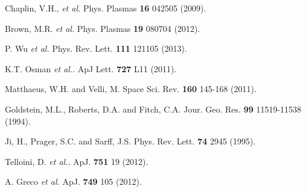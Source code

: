 \documentclass[aps,prl,amsmath,amssymb,reprint,superscriptaddress]{revtex4-1} %
\begin{document}
\begin{thebibliography}{99}
Chaplin, V.H., {\it et al.} Phys. Plasmas {\bf 16} 042505 (2009).

Brown, M.R. {\it et al.} Phys. Plasmas {\bf 19} 080704 (2012).

P. Wu {\it et al.} Phys. Rev. Lett. {\bf 111} 121105 (2013).

K.T. Osman {\it et al.}. ApJ Lett. {\bf 727} L11 (2011).

Matthaeus, W.H. and Velli, M. Space Sci. Rev. {\bf 160} 145-168 (2011).

Goldstein, M.L., Roberts, D.A. and Fitch, C.A. Jour. Geo. Res. {\bf 99} 11519-11538 (1994).

Ji, H., Prager, S.C. and Sarff, J.S. Phys. Rev. Lett. {\bf 74} 2945 (1995).

Telloini, D. {\it et al.}. ApJ. {\bf 751} 19 (2012).

A. Greco {\it et al.} ApJ. {\bf 749} 105 (2012).

\end{thebibliography}
\end{document}
